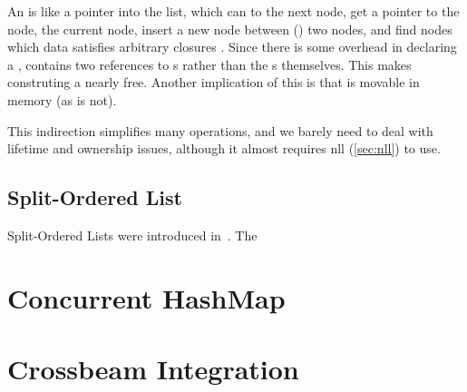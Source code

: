 An  is like a pointer into the list, which can  to the next node, get a
pointer to the  node,  the current node, insert a new node between
() two nodes, and find nodes which data satisfies arbitrary closures
.  Since there is some overhead in declaring a , 
contains two references to s rather than the s themselves. This makes
construting a  nearly free.  Another implication of this is that  is
movable in memory (as  is not).

This indirection simplifies many operations, and we barely need to deal with lifetime and ownership
issues, although it almost requires \gls{nll} (\cref{sec:nll}) to use.

\begin{figure}[ht]

\end{figure}




\subsection{Split-Ordered List}

Split-Ordered Lists were introduced in~\cite{shalev2006split}. The






\section{Concurrent HashMap}
\blindtext{}








\section{Crossbeam Integration}
\blindtext{}

